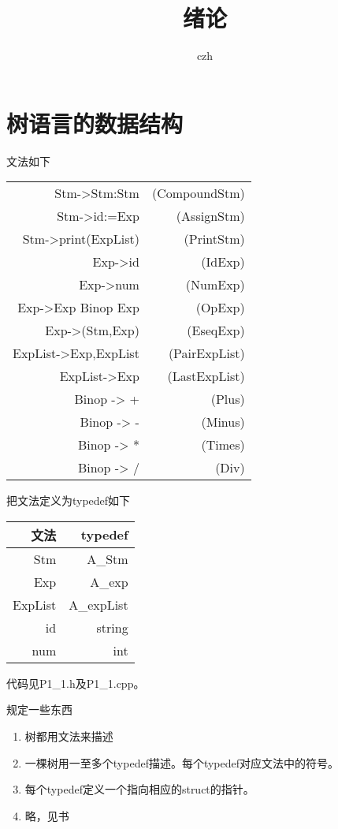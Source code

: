 \documentclass[UTF8]{ctexart}
\title{绪论}
\author{czh}
\begin{document}
    \maketitle
    \tableofcontents
    \section{树语言的数据结构}
    文法如下


    \begin{tabular}{rr}
        \hline
        Stm->Stm:Stm & (CompoundStm) \\
        Stm->id:=Exp & (AssignStm) \\
        Stm->print(ExpList) & (PrintStm) \\
        Exp->id & (IdExp) \\
        Exp->num & (NumExp) \\
        Exp->Exp Binop Exp & (OpExp) \\
        Exp->(Stm,Exp) & (EseqExp) \\
        ExpList->Exp,ExpList & (PairExpList) \\
        ExpList->Exp & (LastExpList) \\
        Binop -> + & (Plus) \\
        Binop -> - & (Minus) \\
        Binop -> * & (Times) \\
        Binop -> / & (Div) \\
        \hline
    \end{tabular}


    把文法定义为typedef如下


    \begin{tabular}{rr}
        \hline
        文法 & typedef \\
        \hline
        Stm & A\_Stm \\
        Exp & A\_exp \\
        ExpList & A\_expList \\
        id & string \\
        num & int \\
        \hline
    \end{tabular}


    代码见P1\_1.h及P1\_1.cpp。
    

    规定一些东西

    \begin{enumerate}[(1)]
        \item 树都用文法来描述
        \item 一棵树用一至多个typedef描述。每个typedef对应文法中的符号。
        \item 每个typedef定义一个指向相应的struct的指针。
        \item 略，见书
    \end{enumerate}
\end{document}
